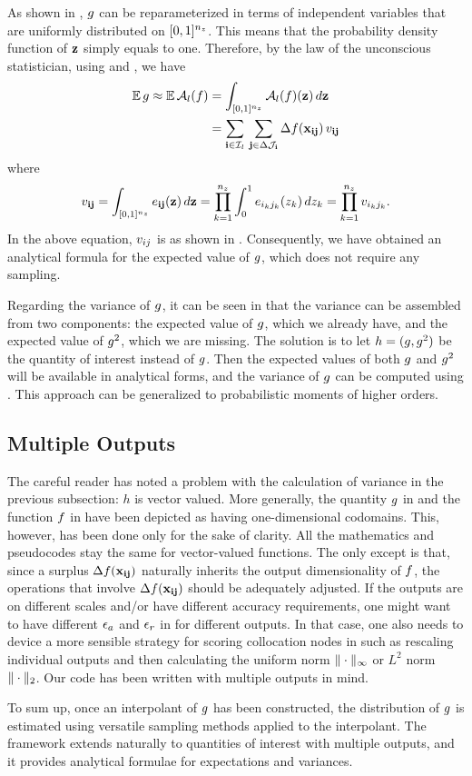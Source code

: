 As shown in , $g$ can be reparameterized in terms of
independent variables that are uniformly distributed on $[0, 1]^{n_z}$. This means
that the probability density function of $\mathbf{z}$ simply equals to one. Therefore,
by the law of the unconscious statistician, using  and
, we have
\begin{align*}
  \mathbb{E} \, g \approx \mathbb{E} \, \mathcal{A}_{l}(f) &= \int_{[0, 1]^{n_z}} \mathcal{A}_{l}(f)(\mathbf{z}) \, d\mathbf{z} \\
  &= \sum_{\mathbf{i} \in \mathcal{I}_l} \, \sum_{\mathbf{j} \in \Delta\mathcal{J}_{\mathbf{i}}} \Delta f(\mathbf{x}_{\mathbf{i}\mathbf{j}}) \, v_{\mathbf{i}\mathbf{j}}
\end{align*}
where
\[
  v_{\mathbf{i}\mathbf{j}} = \int_{[0, 1]^{n_z}} e_{\mathbf{i}\mathbf{j}}(\mathbf{z}) \, d\mathbf{z} = \prod_{k = 1}^{{n_z}} \int_0^1 e_{i_k j_k}(z_k) \, dz_k = \prod_{k = 1}^{{n_z}} v_{i_k j_k}.
\]
In the above equation, $v_{ij}$ is as shown in . Consequently, we
have obtained an analytical formula for the expected value of $g$, which does
not require any sampling.

Regarding the variance of $g$, it can be seen in  that the
variance can be assembled from two components: the expected value of $g$, which
we already have, and the expected value of $g^2$, which we are missing. The
solution is to let $h = (g, g^2)$ be the quantity of interest instead of $g$.
Then the expected values of both $g$ and $g^2$ will be available in analytical
forms, and the variance of $g$ can be computed using . This
approach can be generalized to probabilistic moments of higher orders.

\subsection{Multiple Outputs}
The careful reader has noted a problem with the calculation of variance in the
previous subsection: $h$ is vector valued. More generally, the quantity $g$ in
 and the function $f$ in  have been depicted
as having one-dimensional codomains. This, however, has been done only for the
sake of clarity. All the mathematics and pseudocodes stay the same for
vector-valued functions. The only except is that, since a surplus
$\Delta f(\mathbf{x}_{\mathbf{i}\mathbf{j}})$ naturally inherits the output dimensionality of $f$,
the operations that involve $\Delta f(\mathbf{x}_{\mathbf{i}\mathbf{j}})$ should be adequately
adjusted. If the outputs are on different scales and/or have different accuracy
requirements, one might want to have different $\epsilon_a$ and $\epsilon_r$ in
 for different outputs. In that case, one also needs to
device a more sensible strategy for scoring collocation nodes in 
such as rescaling individual outputs and then calculating the uniform norm
$\| \cdot \|_\infty$ or $L^2$ norm $\| \cdot \|_2$. Our code \cite{sources}
has been written with multiple outputs in mind.

To sum up, once an interpolant of $g$ has been constructed, the distribution of
$g$ is estimated using versatile sampling methods applied to the interpolant.
The framework extends naturally to quantities of interest with multiple outputs,
and it provides analytical formulae for expectations and variances.
